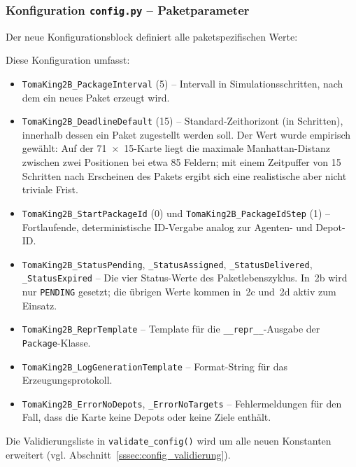 
\subsubsection{Konfiguration \texttt{config.py} – Paketparameter}

Der neue Konfigurationsblock definiert alle paketspezifischen Werte:



Diese Konfiguration umfasst:
\begin{itemize}
    \item \texttt{TomaKing2B\_PackageInterval} (5) -- Intervall in Simulationsschritten, nach dem ein neues Paket erzeugt wird.
    \item \texttt{TomaKing2B\_DeadlineDefault} (15) -- Standard-Zeithorizont (in Schritten), innerhalb dessen ein Paket zugestellt werden soll. Der Wert wurde empirisch gewählt: Auf der 71~\(\times\)~15-Karte liegt die maximale Manhattan-Distanz zwischen zwei Positionen bei etwa 85 Feldern; mit einem Zeitpuffer von 15 Schritten nach Erscheinen des Pakets ergibt sich eine realistische aber nicht triviale Frist.
    \item \texttt{TomaKing2B\_StartPackageId} (0) und \texttt{TomaKing2B\_PackageIdStep} (1) -- Fortlaufende, deterministische ID-Vergabe analog zur Agenten- und Depot-ID.
    \item \texttt{TomaKing2B\_StatusPending}, \texttt{\_StatusAssigned}, \texttt{\_StatusDelivered}, \texttt{\_StatusExpired} -- Die vier Status-Werte des Paketlebenszyklus. In~2b wird nur \texttt{PENDING} gesetzt; die übrigen Werte kommen in~2c und~2d aktiv zum Einsatz.
    \item \texttt{TomaKing2B\_ReprTemplate} -- Template für die \texttt{\_\_repr\_\_}-Ausgabe der \texttt{Package}-Klasse.
    \item \texttt{TomaKing2B\_LogGenerationTemplate} -- Format-String für das Erzeugungsprotokoll.
    \item \texttt{TomaKing2B\_ErrorNoDepots}, \texttt{\_ErrorNoTargets} -- Fehlermeldungen für den Fall, dass die Karte keine Depots oder keine Ziele enthält.
\end{itemize}

Die Validierungsliste in \texttt{validate\_config()} wird um alle neuen Konstanten erweitert (vgl. Abschnitt~\ref{sssec:config_validierung}).

